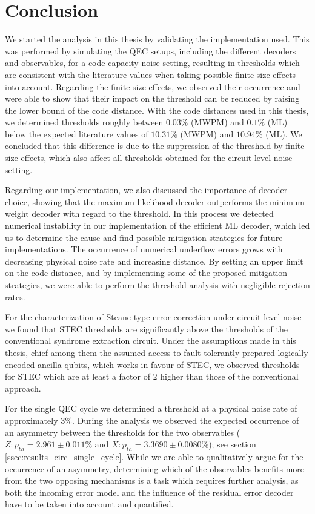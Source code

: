 \chapter{Conclusion}\label{chapter:conclusion}

We started the analysis in this thesis by validating the implementation used. 
This was performed by simulating the QEC setups, including the different decoders and observables, for a code-capacity noise setting,
resulting in thresholds which are consistent with the literature values when taking possible finite-size effects into account.
Regarding the finite-size effects, we observed their occurrence and were able to show
that their impact on the threshold can be reduced by raising the lower bound of the code distance.
With the code distances used in this thesis, we determined thresholds roughly between $0.03\%$ (MWPM) and $0.1\%$ (ML) below the expected literature values of $10.31\%$ (MWPM) and $10.94\%$ (ML).
We concluded that this difference is due to the suppression of the threshold by finite-size effects, 
which also affect all thresholds obtained for the circuit-level noise setting.

Regarding our implementation, we also discussed the importance of decoder choice, showing that 
the maximum-likelihood decoder outperforms the minimum-weight decoder with regard to the threshold. 
In this process we detected numerical instability in our implementation of the efficient ML decoder,
which led us to determine the cause and find possible mitigation strategies for future implementations.
The occurrence of numerical underflow errors grows with decreasing physical noise rate and increasing distance. 
By setting an upper limit on the code distance, and by implementing some of the proposed mitigation strategies, 
we were able to perform the threshold analysis with negligible rejection rates.

For the characterization of Steane-type error correction under circuit-level noise 
we found that STEC thresholds are significantly above the thresholds of the conventional syndrome extraction circuit.
Under the assumptions made in this thesis, 
chief among them the assumed access to fault-tolerantly prepared logically encoded ancilla qubits, 
which works in favour of STEC,
we observed thresholds for STEC which are at least a factor of $2$ higher than those of the conventional approach. 
 
For the single QEC cycle we determined a threshold at a physical noise rate of approximately $3\%$.
During the analysis we observed the expected occurrence of an asymmetry between the thresholds for the two observables ($\bar{Z}: p_{th} = 2.961 \pm 0.011 \%$ and $\bar{X}: p_{th} = 3.3690 \pm 0.0080 \% $); see section \ref{ssec:results_circ_single_cycle}.
While we are able to qualitatively argue for the occurrence of an asymmetry, 
determining which of the observables benefits more from the two opposing mechanisms 
is a task which requires further analysis, as both the incoming error model 
and the influence of the residual error decoder have to be taken into account and quantified.

